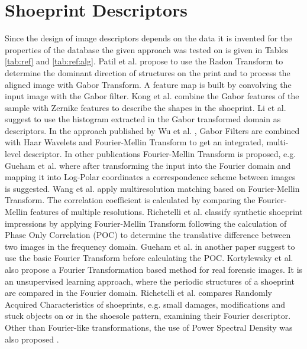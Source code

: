 \documentclass[draft,final]{vutinfth} %
\begin{document}
\section*{Shoeprint Descriptors}
\par
Since the design of image descriptors depends on the data it is invented for the properties of the database the given approach was tested on is given in Tables \ref{tab:ref} and \ref{tab:ref:alg}.
Patil et al. \cite{patil2009rotation} propose to use the Radon Transform to determine the dominant direction of structures on the print and to process the aligned image with Gabor Transform.
A feature map is built by convolving the input image with the Gabor filter.
Kong et al.  \cite{kong2014novel} combine the Gabor features of the sample with Zernike features to describe the shapes in the shoeprint.
Li et al. \cite{li2014retrieval} suggest to use the histogram extracted in the Gabor transformed domain as descriptors.
In the approach published by Wu et al.  \cite{wu2019crime}, Gabor Filters are combined with Haar Wavelets and Fourier-Mellin Transform to get an integrated, multi-level descriptor. 
In other publications Fourier-Mellin Transform is proposed, e.g. Gueham et al. \cite{gueham2008automatic} where after transforming the input into the Fourier domain and mapping it into Log-Polar coordinates a correspondence scheme between images is suggested.
Wang et al. \cite{wang2014automatic} apply multiresolution matching based on  Fourier-Mellin Transform.
The correlation coefficient is calculated by comparing the Fourier-Mellin features of multiple resolutions.
Richetelli et al. \cite{richetelli2017classification} classify synthetic shoeprint impressions by applying Fourier-Mellin Transform following the calculation of Phase Only Correlation (POC) to determine the translative difference between two images in the frequency domain.
Gueham et al. \cite{gueham2007automatic} in another paper suggest to use the basic Fourier Transform before calculating the POC.
Kortylewsky et al. \cite{kortylewski2014unsupervised} also propose a Fourier Transformation based method for real forensic images.
It is an unsupervised learning approach, where the periodic structures of a shoeprint are compared in the Fourier domain.
Richetelli et al. \cite{richetelli2017quantitative} compares Randomly Acquired Characteristics of shoeprints, e.g. small damages, modifications and stuck objects on or in the shoesole pattern, examining their Fourier descriptor.
Other than Fourier-like transformations, the use of Power Spectral Density was also proposed \cite{dardi2009texture}.
\end{document}
